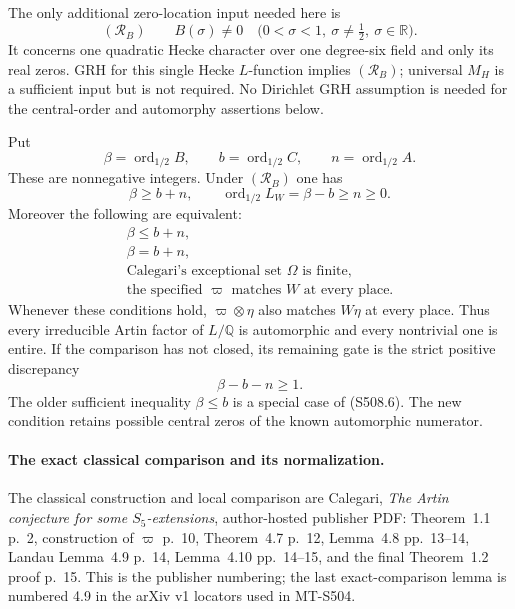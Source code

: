 The only additional zero-location input needed here is
\[
  (\mathcal R_B)\qquad
  B(\sigma)\ne0\quad
  \bigl(0<\sigma<1,\ \sigma\ne\tfrac12,\ \sigma\in\mathbb R\bigr).
 \tag{S508.3}
\]
It concerns one quadratic Hecke character over one degree-six
field and only its real zeros.  GRH for this single Hecke
$L$-function implies $(\mathcal R_B)$; universal $M_H$ is a
sufficient input but is not required.  No Dirichlet GRH assumption
is needed for the central-order and automorphy assertions below.

Put
\[
 \beta=\operatorname{ord}_{1/2} B,\qquad
 b=\operatorname{ord}_{1/2} C,\qquad
 n=\operatorname{ord}_{1/2} A.
 \tag{S508.4}
\]
These are nonnegative integers.  Under $(\mathcal R_B)$ one has
\[
             \beta\ge b+n,
       \qquad \operatorname{ord}_{1/2}L_W=\beta-b\ge n\ge0.
 \tag{S508.5}
\]
Moreover the following are equivalent:
\[
 \begin{gathered}
       \beta\le b+n,\\
       \beta=b+n,\\
       \text{Calegari's exceptional set }\Omega\text{ is finite},\\
       \text{the specified }\varpi\text{ matches }W
             \text{ at every place}.
 \end{gathered}
 \tag{S508.6}
\]
Whenever these conditions hold, $\varpi\otimes\eta$ also matches
$W\eta$ at every place.  Thus every irreducible Artin factor of
$L/\mathbb Q$ is automorphic and every nontrivial one is entire.
If the comparison has not closed, its remaining gate is the
strict positive discrepancy
\[
                        \beta-b-n\ge1.
 \tag{S508.7}
\]
The older sufficient inequality $\beta\le b$ is a special case
of (S508.6).  The new condition retains possible central zeros
of the known automorphic numerator.

\paragraph{The exact classical comparison and its normalization.}
The classical construction and local comparison are Calegari,
\emph{The Artin conjecture for some $S_5$-extensions},
author-hosted publisher PDF: Theorem~1.1 p.~2, construction of
$\varpi$ p.~10, Theorem~4.7 p.~12, Lemma~4.8 pp.~13--14,
Landau Lemma~4.9 p.~14, Lemma~4.10 pp.~14--15, and the final
Theorem~1.2 proof p.~15.  This is the publisher numbering;
the last exact-comparison lemma is numbered 4.9 in the
arXiv v1 locators used in MT-S504.

